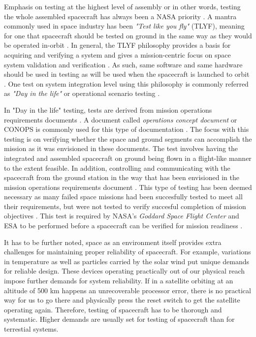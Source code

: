 \documentclass[english,12pt,a4paper,pdftex,elec,utf8]{aaltothesis}
\begin{document}
Emphasis on testing at the highest level of assembly or in other words, testing the whole assembled spacecraft has always been a NASA priority \cite{reliabilitylessonsfromnasa}. A mantra commonly used in space industry has been \textit{"Test like you fly"} (TLYF), meaning for one that spacecraft should be tested on ground in the same way as they would be operated in-orbit \cite{satverplanning, tor}.  In general, the TLYF philosophy provides a basis for acquiring and verifying a system and gives a mission-centric focus on space system validation and verification \cite{tor}. As such, same software and same hardware should be used in testing as will be used when the spacecraft is launched to orbit \cite{satverplanning}. One test on system integration level using this philosophy is commonly referred as \textit{"Day in the life"} or operational scenario testing \cite{satverplanning, tor}. \par
In "Day in the life" testing, tests are derived from mission operations requirements documents \cite{tor}. A document called \textit{operations concept document} or CONOPS is commonly used for this type of documentation \cite{tor}. The focus with this testing is on verifying whether the space and ground segments can accomplish the mission as it was envisioned in these documents. The test involves having the integrated and assembled spacecraft on ground being flown in a flight-like manner to the extent feasible. In addition, controlling and communicating with the spacecraft from the ground station in the way that has been envisioned in the mission operations requirements document \cite{tor}. This type of testing has been deemed necessary as many failed space missions had been succesfully tested to meet all their requirements, but were not tested to verify succesful completion of mission objectives \cite{tor}. This test is required by NASA's \textit{Goddard Space Flight Center} and ESA to be performed before a spacecraft can be verified for mission readiness \cite{tor, ecss}. \par
It has to be further noted, space as an environment itself provides extra challenges for maintaining proper reliability of spacecraft. For example, variations in temperature as well as particles carried by the solar wind put unique demands for reliable design. These devices operating practically out of our physical reach impose further demands for system reliability. If in a satellite orbiting at an altitude of 500 km happens an unrecoverable processor error, there is no practical way for us to go there and physically press the reset switch to get the satellite operating again. Therefore, testing of spacecraft has to be thorough and systematic. Higher demands are usually set for testing of spacecraft than for terrestial systems. \cite{spacesystemsengineering} \par 
\end{document}
